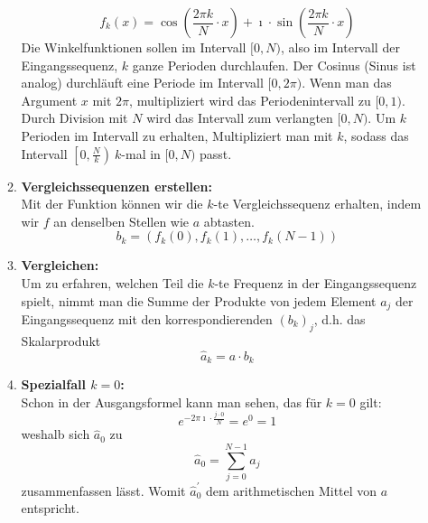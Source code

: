 \begin{itemize}
\begin{enumerate}
		\[f_k(x) = \cos\left(\frac{2\pi k}{N}\cdot x\right) + \imath \cdot\sin\left(\frac{2\pi k}{N}\cdot x\right) \]
		Die Winkelfunktionen sollen im Intervall \([0,N)\), also im Intervall der Eingangssequenz, \(k\) ganze Perioden durchlaufen. Der Cosinus (Sinus ist analog) durchläuft eine Periode im Intervall \([0,2\pi)\). Wenn man das Argument \(x\) mit \(2\pi\), multipliziert wird das Periodenintervall zu \([0,1)\). Durch Division mit \(N\) wird das Intervall zum verlangten \([0,N)\). Um \(k\) Perioden im Intervall zu erhalten, Multipliziert man mit \(k\), sodass das Intervall \(\left[0,\frac{N}{k}\right) ~k\)-mal in \([0,N)\) passt.
		\item \textbf{Vergleichssequenzen erstellen:}\\
		Mit der Funktion können wir die \(k\)-te Vergleichssequenz erhalten, indem wir \(f\) an denselben Stellen wie \(a\) abtasten.
		\[b_k = \left(f_k(0),f_k(1),\dots,f_k(N-1)\right) \]
		\item \textbf{Vergleichen:}\\
		Um zu erfahren, welchen Teil die \(k\)-te Frequenz in der Eingangssequenz spielt, nimmt man die Summe der Produkte von jedem Element \(a_j\) der Eingangssequenz mit den korrespondierenden \({(b_k)}_j\), d.h. das Skalarprodukt
		\[\hat{a}_k = a \cdot b_k\]
		\item \textbf{Spezialfall \(k = 0\):}\\
		Schon in der Ausgangsformel kann man sehen, das	für \(k = 0\) gilt: \[e^{-2\pi \imath \cdot\frac{j\cdot 0}{N}} = e^0 = 1\]
		weshalb sich \(\hat{a}_0\) zu
		\[\hat{a}_0 = \sum_{j=0}^{N-1} a_j\] zusammenfassen lässt. Womit \(\hat{a}^\prime_0 \) dem arithmetischen Mittel von \(a\) entspricht.
	\end{enumerate}
\end{itemize}
